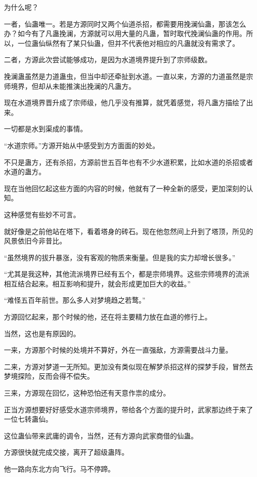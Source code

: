 \begin{this_body}
为什么呢？

一者，仙蛊唯一。若是方源同时又两个仙道杀招，都需要用挽澜仙蛊，那该怎么办？如今有了凡蛊挽澜，方源就可以用大量的凡蛊，暂时取代挽澜仙蛊的作用。所以，一位蛊仙纵然有了某只仙蛊，但并不代表他对相应的凡蛊就没有需求了。

二者，方源此次尝试能够成功，是因为水道境界提升到了宗师级数。

挽澜蛊虽然是力道蛊虫，但当中却还牵扯到水道。一直以来，方源的力道虽然是宗师境界，但却从未能推演出挽澜的凡蛊方。

现在水道境界晋升成了宗师级，他几乎没有推算，就凭着感觉，将凡蛊方描绘了出来。

一切都是水到渠成的事情。

“水道宗师。”方源开始从中感受到方方面面的妙处。

不只是蛊方，还有杀招，方源前世五百年也有不少水道积累，比如水道的杀招或者水道的蛊方。

现在当他回忆起这些方面的内容的时候，他就有了一种全新的感受，更加深刻的认知。

这种感觉有些妙不可言。

就好像是之前他站在塔下，看着塔身的砖石。现在他忽然间上升到了塔顶，所见的风景依旧今非昔比。

“虽然境界的拔升暴涨，没有客观的物质来衡量。但是我的实力却增长很多。”

“尤其是我这种，其他流派境界已经有五个，都是宗师境界。这些宗师境界的流派相互结合起来。相互影响和提升，就会形成更加巨大的收益。”

“难怪五百年前世。那么多人对梦境趋之若鹜。”

方源回忆起来，那个时候的他，还在将主要精力放在血道的修行上。

当然，这也是有原因的。

一来，方源那个时候的处境并不算好，外在一直强敌，方源需要战斗力量。

二来，方源对梦道一无所知。更加没有类似现在解梦杀招这样的探梦手段，冒然去梦境探险，反而会得不偿失。

三来，方源现在回忆，这种恐怕还有天意作祟的成分。

正当方源想要好好感受水道宗师境界，带给各个方面的提升时，武家那边终于来了一位七转蛊仙。

这位蛊仙带来武庸的调令，当然，还有方源向武家商借的仙蛊。

方源很快就完成交接，离开了超级蛊阵。

他一路向东北方向飞行。马不停蹄。


\end{this_body}
